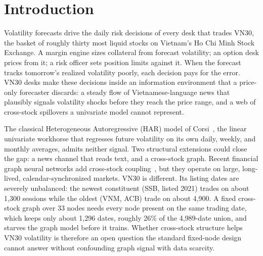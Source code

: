 \documentclass[runningheads]{llncs}
\newcommand{\HARtestQ}{0.5793}   %
\newcommand{\HARQtestQ}{0.5737}  %
\newcommand{\ntick}{33}
\begin{document}
\begin{abstract}
training, HAR $+$ graph-residual, directed spillover edges, learned adjacency, omit-self-loop) beats a
well-specified HAR at a Diebold--Mariano-significant level. HAR and
HARQ tie the deep models on the level metrics (test QLIKE \HARtestQ{} and \HARQtestQ, $R^2\approx0.767$),
while GARCH-family models are far worse (test QLIKE $1.75$--$1.86$, $R^2\approx0$). We present G1 as the
proposed architecture and report a rigorous parsimony finding: news content improves the forecast but
cross-stock graph propagation does not. Directional accuracy stays near $48\%$ for every forecaster
because the daily Parkinson target's day-to-day change is anti-persistent (sign lag-1 autocorrelation
$-0.30$, negative for all \ntick{} tickers).

\end{abstract}
%
\section{Introduction}
\label{sec:intro}
Volatility forecasts drive the daily risk decisions of every desk that trades VN30, the basket of
roughly thirty most liquid stocks on Vietnam's Ho Chi Minh Stock Exchange. A margin engine sizes
collateral from forecast volatility; an option desk prices from it; a risk officer sets position limits
against it. When the forecast tracks tomorrow's realized volatility poorly, each decision pays for the
error. VN30 desks make these decisions inside an information environment that a price-only forecaster
discards: a steady flow of Vietnamese-language news that plausibly signals volatility shocks before they
reach the price range, and a web of cross-stock spillovers a univariate model cannot represent.

The classical Heterogeneous Autoregressive (HAR) model of Corsi~\cite{corsi2009}, the linear univariate
workhorse that regresses future volatility on its own daily, weekly, and monthly averages, admits
neither signal. Two structural extensions could close the gap: a news channel that reads text, and a
cross-stock graph. Recent financial graph neural networks add cross-stock
coupling~\cite{velickovic2018,chen2022,zhang2025gnnhar}, but they operate on large, long-lived,
calendar-synchronized markets. VN30 is different. Its listing dates are severely unbalanced: the newest
constituent (SSB, listed 2021) trades on about 1{,}300 sessions while the oldest (VNM, ACB) trade on
about 4{,}900. A fixed cross-stock graph over \ntick{} nodes needs every node present on the same
trading date, which keeps only about 1{,}296 dates, roughly 26\% of the 4{,}989-date union, and starves
the graph model before it trains. Whether cross-stock structure helps VN30 volatility is therefore an
open question the standard fixed-node design cannot answer without confounding graph signal with data
scarcity.
\end{document}
